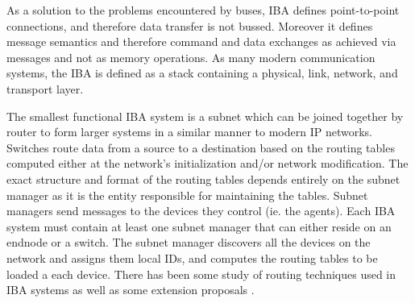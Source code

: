 	
	
	

As a solution to the problems encountered by buses, IBA defines  point-to-point connections, and therefore data transfer is not bussed. Moreover it defines message semantics and therefore command and data exchanges as achieved via messages and not as memory operations. As many modern communication systems, the IBA is defined as a stack containing a physical, link, network,  and transport layer.  

	

 
 The smallest functional IBA system is a subnet which can be joined together by router to form larger systems in a similar manner to modern IP networks. Switches route data from a source to a destination based on the routing tables computed either at the network's initialization and/or network modification. The exact structure and format of the routing tables depends entirely on the subnet manager as it is the entity responsible for maintaining the tables. Subnet managers send messages to the devices they control (ie. the agents).  Each IBA system must contain at least one subnet manager that can either reside on an endnode or a switch.  The subnet manager discovers all the devices on the network and assigns them local IDs, and computes the routing tables to be loaded a each device. There has been some study of routing techniques used in IBA systems \cite{IBACurrentRoute} as well as some extension proposals \cite{IBAExtensions}.
 
